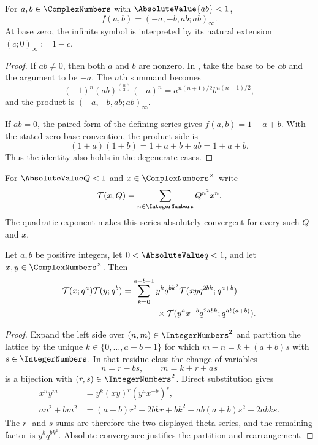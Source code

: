 \begin{proposition}
\label{qg:prop-ramanujan-product}
For $a,b\in\ComplexNumbers$ with $\AbsoluteValue{ab}<1$,
\begin{equation}
 f(a,b)=(-a,-b,ab;ab)_\infty.
\label{eq:qg-ramanujan-product}
\end{equation}
At base zero, the infinite symbol is interpreted by its natural extension
$(c;0)_\infty:=1-c$.
\end{proposition}

\begin{proof}
If $ab\ne0$, then both $a$ and $b$ are nonzero.  In , take
the base to be $ab$ and the argument to be $-a$.  The $n$th summand becomes
\[
 (-1)^n(ab)^{\binom n2}(-a)^n
 =a^{n(n+1)/2}b^{n(n-1)/2},
\]
and the product is $(-a,-b,ab;ab)_\infty$.

If $ab=0$, the paired form of the defining series gives
$f(a,b)=1+a+b$.  With the stated zero-base convention, the product side is
\[
 (1+a)(1+b)=1+a+b+ab=1+a+b.
\]
Thus the identity also holds in the degenerate cases.
\end{proof}

For $\AbsoluteValue Q<1$ and $x\in\ComplexNumbers^\times$ write
\[
 \mathcal T(x;Q)=\sum_{n\in\IntegerNumbers}Q^{n^2}x^n.
\]
The quadratic exponent makes this series absolutely convergent for every such
$Q$ and $x$.

\begin{theorem}
\label{qg:thm-schroeter}
Let $a,b$ be positive integers, let $0<\AbsoluteValue q<1$, and let
$x,y\in\ComplexNumbers^\times$.  Then
\begin{align}
 \mathcal T(x;q^a)\mathcal T(y;q^b)
 &=\sum_{k=0}^{a+b-1}y^kq^{bk^2}
 \mathcal T(xyq^{2bk};q^{a+b})\notag\\
 &\qquad\qquad\times
 \mathcal T(y^ax^{-b}q^{2abk};q^{ab(a+b)}).
\label{eq:qg-schroeter}
\end{align}
\end{theorem}

\begin{proof}
Expand the left side over $(n,m)\in\IntegerNumbers^2$ and partition the
lattice by the unique $k\in\{0,\ldots,a+b-1\}$ for which
$m-n=k+(a+b)s$ with $s\in\IntegerNumbers$.  In that residue class the
change of variables
\[
 n=r-bs,
 \qquad
 m=k+r+as
\]
is a bijection with $(r,s)\in\IntegerNumbers^2$.  Direct substitution gives
\begin{align*}
 x^ny^m&=y^k(xy)^r(y^ax^{-b})^s,\\
 an^2+bm^2
 &=(a+b)r^2+2bkr+bk^2
   +ab(a+b)s^2+2abks.
\end{align*}
The $r$- and $s$-sums are therefore the two displayed theta series, and the
remaining factor is $y^kq^{bk^2}$.  Absolute convergence justifies the
partition and rearrangement.
\end{proof}

